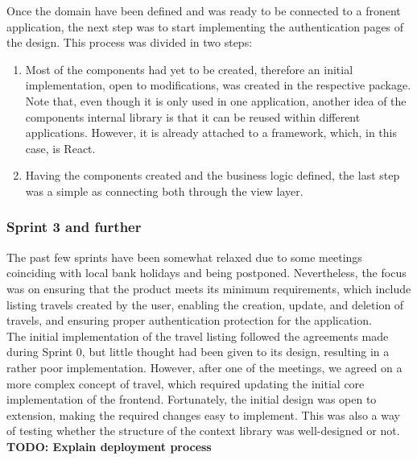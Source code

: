 \documentclass[../memory.tex]{subfiles}
\begin{document}
Once the domain have been defined and was ready to be connected to a fronent
application, the next step was to start implementing the authentication pages of
the design. This process was divided in two steps:
\begin{enumerate}[label = \arabic{*}.]
	\item Most of the components had yet to be created, therefore an initial
	      implementation, open to modifications, was created in the respective
	      package. Note that, even though it is only used in one application, another
	      idea of the components internal library is that it can be reused within
	      different applications. However, it is already attached to a framework,
	      which, in this case, is React.
	\item Having the components created and the business logic defined, the last
	      step was a simple as connecting both through the view layer.
\end{enumerate}
\subsubsection{Sprint 3 and further}
The past few sprints have been somewhat relaxed due to some meetings coinciding
with local bank holidays and being postponed. Nevertheless, the focus was on
ensuring that the product meets its minimum requirements, which include listing
travels created by the user, enabling the creation, update, and deletion of
travels, and ensuring proper authentication protection for the application.
\\[8pt]
The initial implementation of the travel listing followed the agreements made
during Sprint 0, but little thought had been given to its design, resulting in a
rather poor implementation. However, after one of the meetings, we agreed on a
more complex concept of travel, which required updating the initial core
implementation of the frontend. Fortunately, the initial design was open to
extension, making the required changes easy to implement. This was also a way of
testing whether the structure of the context library was well-designed or not.
\\[8pt]
\textbf{TODO: Explain deployment process}
\end{document}
